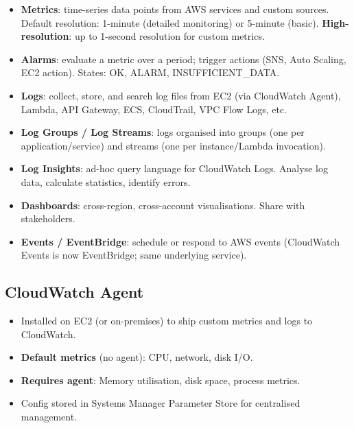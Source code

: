 

\begin{keyfacts}
\begin{itemize}
  \item \textbf{Metrics}: time-series data points from AWS services and custom sources.
        Default resolution: 1-minute (detailed monitoring) or 5-minute (basic).
        \textbf{High-resolution}: up to 1-second resolution for custom metrics.
  \item \textbf{Alarms}: evaluate a metric over a period; trigger actions
        (SNS, Auto Scaling, EC2 action). States: OK, ALARM, INSUFFICIENT\_DATA.
  \item \textbf{Logs}: collect, store, and search log files from EC2 (via CloudWatch Agent),
        Lambda, API Gateway, ECS, CloudTrail, VPC Flow Logs, etc.
  \item \textbf{Log Groups / Log Streams}: logs organised into groups (one per application/service)
        and streams (one per instance/Lambda invocation).
  \item \textbf{Log Insights}: ad-hoc query language for CloudWatch Logs. Analyse log data,
        calculate statistics, identify errors.
  \item \textbf{Dashboards}: cross-region, cross-account visualisations. Share with stakeholders.
  \item \textbf{Events / EventBridge}: schedule or respond to AWS events (CloudWatch Events is now
        EventBridge; same underlying service).
\end{itemize}
\end{keyfacts}

\subsection{CloudWatch Agent}

\begin{itemize}
  \item Installed on EC2 (or on-premises) to ship custom metrics and logs to CloudWatch.
  \item \textbf{Default metrics} (no agent): CPU, network, disk I/O.
  \item \textbf{Requires agent}: Memory utilisation, disk space, process metrics.
  \item Config stored in Systems Manager Parameter Store for centralised management.
\end{itemize}

